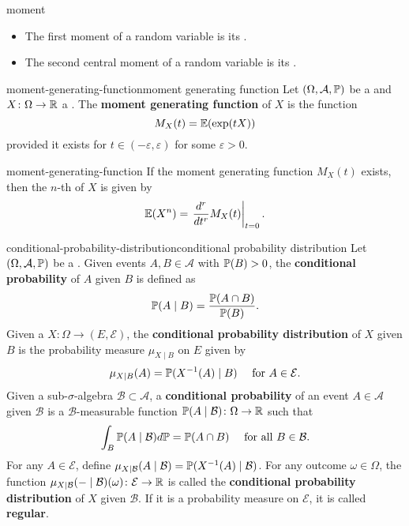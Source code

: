 \begin{example}{moment}
    \begin{itemize}
        \item The first moment of a random variable is its .
        \item The second central moment of a random variable is its .
    \end{itemize}
\end{example}

\begin{topic}{moment-generating-function}{moment generating function}
    Let $(\Omega, \mathcal{A}, \mathbb{P})$ be a  and $X \colon \Omega \to \mathbb{R}$ a . The \textbf{moment generating function} of $X$ is the function
    \[ M_X(t) = \mathbb{E}(\exp(t X)) \]
    provided it exists for $t \in (-\varepsilon, \varepsilon)$ for some $\varepsilon > 0$.
\end{topic}

\begin{example}{moment-generating-function}
    If the moment generating function $M_X(t)$ exists, then the $n$-th  of $X$ is given by 
    \[ \mathbb{E}(X^n) = \left. \frac{d^r}{dt^r} M_X(t) \right|_{t = 0} . \]
\end{example}

\begin{topic}{conditional-probability-distribution}{conditional probability distribution}
    Let $(\Omega, \mathcal{A}, \mathbb{P})$ be a . Given events $A, B \in \mathcal{A}$ with $\mathbb{P}(B) > 0$, the \textbf{conditional probability} of $A$ given $B$ is defined as
    \[ \mathbb{P}(A \mid B) = \frac{\mathbb{P}(A \cap B)}{\mathbb{P}(B)} . \]
    Given a  $X \colon \Omega \to (E, \mathcal{E})$, the \textbf{conditional probability distribution} of $X$ given $B$ is the probability measure $\mu_{X \mid B}$ on $E$ given by
    \[ \mu_{X \mid B}(A) = \mathbb{P}(X^{-1}(A) \mid B) \quad \textup{ for } A \in \mathcal{E} . \]
    Given a sub-$\sigma$-algebra $\mathcal{B} \subset \mathcal{A}$, a \textbf{conditional probability} of an event $A \in \mathcal{A}$ given $\mathcal{B}$ is a $\mathcal{B}$-measurable function $\mathbb{P}(A \mid \mathcal{B}) \colon \Omega \to \mathbb{R}$ such that
    \[ \int_B \mathbb{P}(A \mid \mathcal{B}) d \mathbb{P} = \mathbb{P}(A \cap B) \quad \textup{ for all } B \in \mathcal{B} . \]
    For any $A \in \mathcal{E}$, define $\mu_{X \mid \mathcal{B}}(A \mid \mathcal{B}) = \mathbb{P}(X^{-1}(A) \mid \mathcal{B})$. For any outcome $\omega \in \Omega$, the function $\mu_{X \mid \mathcal{B}}(- \mid \mathcal{B})(\omega) \colon \mathcal{E} \to \mathbb{R}$ is called the \textbf{conditional probability distribution} of $X$ given $\mathcal{B}$. If it is a probability measure on $\mathcal{E}$, it is called \textbf{regular}.
\end{topic}

